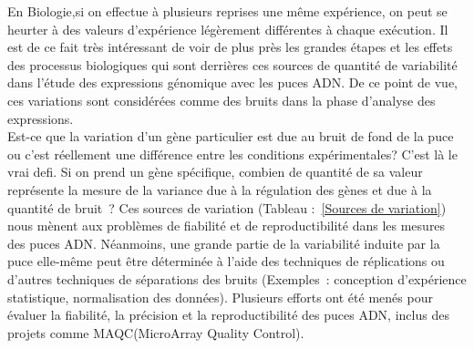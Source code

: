\documentclass[a4paper,10pt]{article}
\begin{document}
En Biologie,si on effectue à plusieurs reprises une même expérience, on peut se heurter à des valeurs d’expérience légèrement différentes à chaque exécution.
Il est de ce fait très intéressant de voir de plus près les grandes étapes et les effets des processus biologiques qui sont derrières ces sources de quantité de variabilité dans l’étude des expressions génomique avec les puces ADN.
De ce point de vue, ces variations sont considérées comme des bruits dans la phase d’analyse des expressions.\\
Est-ce que la variation d’un gène particulier est due au bruit de fond de la puce ou c’est réellement une différence entre les conditions expérimentales? C’est là le vrai defi. 
Si on prend un gène spécifique, combien de quantité de sa valeur représente la mesure de la variance due à la régulation des gènes et due à la quantité de bruit ?
Ces sources de variation (Tableau :~\ref{Sources de variation}\cite{miller2002optimal,wildsmith2001research}) nous mènent aux problèmes de fiabilité et de reproductibilité dans les mesures des puces ADN. %
Néanmoins, une grande partie de la variabilité induite par la puce elle-même  peut être déterminée à l'aide des techniques 
de réplications ou d’autres techniques de séparations des bruits (Exemples : conception d’expérience statistique, normalisation des données).
Plusieurs efforts ont été menés pour évaluer la fiabilité, la précision et la reproductibilité des puces ADN, inclus des projets comme MAQC(MicroArray Quality Control\cite{shi2006microarray}). \\
\end{document}
